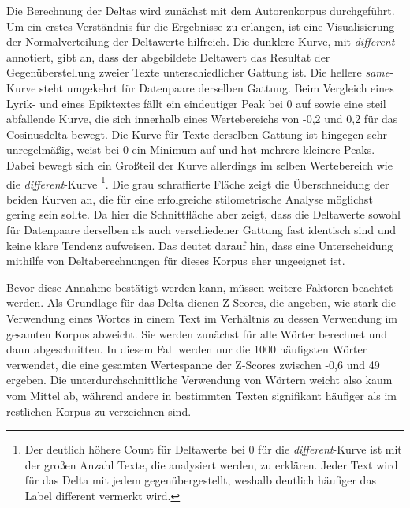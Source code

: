 \documentclass[a4paper,10p]{article}
\begin{document}
Die Berechnung der Deltas wird zunächst mit dem Autorenkorpus durchgeführt. Um ein erstes Verständnis für die Ergebnisse zu erlangen, ist eine Visualisierung der Normalverteilung der Deltawerte hilfreich. Die dunklere Kurve, mit \textit{different} annotiert, gibt an, dass der abgebildete Deltawert das Resultat der Gegenüberstellung zweier Texte unterschiedlicher Gattung ist. Die hellere \textit{same}-Kurve steht umgekehrt für Datenpaare derselben Gattung. Beim Vergleich eines Lyrik- und eines Epiktextes fällt ein eindeutiger Peak bei 0 auf sowie eine steil abfallende Kurve, die sich innerhalb eines Wertebereichs von -0,2 und 0,2 für das Cosinusdelta bewegt. Die Kurve für Texte derselben Gattung ist hingegen sehr unregelmäßig, weist bei 0 ein Minimum auf und hat mehrere kleinere Peaks. Dabei bewegt sich ein Großteil der Kurve allerdings im selben Wertebereich wie die \textit{different}-Kurve \footnote{Der deutlich höhere Count für Deltawerte bei 0 für die \textit{different}-Kurve ist mit der großen Anzahl Texte, die analysiert werden, zu erklären. Jeder Text wird für das Delta mit jedem gegenübergestellt, weshalb deutlich häufiger das Label \glqq different \grqq vermerkt wird.}. Die grau schraffierte Fläche zeigt die Überschneidung der beiden Kurven an, die für eine erfolgreiche stilometrische Analyse möglichst gering sein sollte. Da hier die Schnittfläche aber zeigt, dass die Deltawerte sowohl für Datenpaare derselben als auch verschiedener Gattung fast identisch sind und keine klare Tendenz aufweisen. Das deutet darauf hin, dass eine Unterscheidung mithilfe von Deltaberechnungen für dieses Korpus eher ungeeignet ist. \par 

Bevor diese Annahme bestätigt werden kann, müssen weitere Faktoren beachtet werden. Als Grundlage für das Delta dienen Z-Scores, die angeben, wie stark die Verwendung eines Wortes in einem Text im Verhältnis zu dessen Verwendung im gesamten Korpus abweicht. Sie werden zunächst für alle Wörter berechnet und dann abgeschnitten. In diesem Fall werden nur die 1000 häufigsten Wörter verwendet, die eine gesamten Wertespanne der Z-Scores zwischen -0,6 und 49 ergeben. Die unterdurchschnittliche Verwendung von Wörtern weicht also kaum vom Mittel ab, während andere in bestimmten Texten signifikant häufiger als im restlichen Korpus zu verzeichnen sind. \par 
\end{document}
